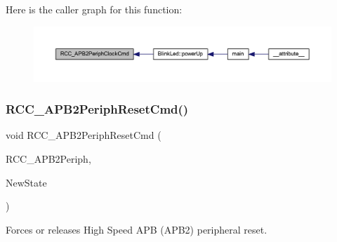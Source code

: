 Here is the caller graph for this function\+:
\nopagebreak
\begin{figure}[H]
\begin{center}
\leavevmode
\includegraphics[width=350pt]{group___r_c_c___exported___functions_ga56ff55caf8d835351916b40dd030bc87_icgraph}
\end{center}
\end{figure}
\mbox{\label{group___r_c_c___exported___functions_gad94553850ac07106a27ee85fec37efdf}} 
\subsubsection{\texorpdfstring{R\+C\+C\+\_\+\+A\+P\+B2\+Periph\+Reset\+Cmd()}{RCC\_APB2PeriphResetCmd()}}
{\footnotesize\ttfamily void R\+C\+C\+\_\+\+A\+P\+B2\+Periph\+Reset\+Cmd (\begin{DoxyParamCaption}\item[{uint32\+\_\+t}]{R\+C\+C\+\_\+\+A\+P\+B2\+Periph,  }\item[{\hyperlink{group___exported__types_gac9a7e9a35d2513ec15c3b537aaa4fba1}{Functional\+State}}]{New\+State }\end{DoxyParamCaption})}



Forces or releases High Speed A\+PB (A\+P\+B2) peripheral reset. 


